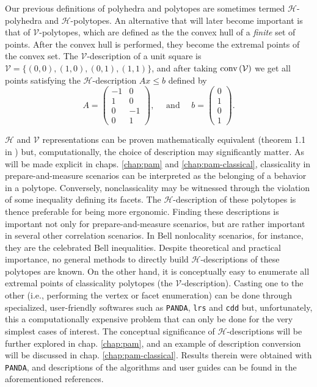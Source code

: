 		Our previous definitions of polyhedra and polytopes are sometimes termed $\mathcal{H}$-polyhedra and $\mathcal{H}$-polytopes. An alternative that will later become important is that of $\mathcal{V}$-polytopes, which are defined as the the convex hull of a \emph{finite} set of points. After the convex hull is performed, they become the extremal points of the convex set. The $\mathcal{V}$-description of a unit square is $\mathcal{V} = \{ (0, 0), (1, 0), (0, 1), (1, 1) \}$, and after taking $\text{conv} \left( \mathcal{V} \right)$ we get all points satisfying the $\mathcal{H}$-description $Ax \leq b$ defined by 
		$$
			A =
			\begin{pmatrix}
				-1 & 0 \\
				1 & 0 \\
				0 & -1 \\
				0 & 1
			\end{pmatrix},
			\quad\text{ and }\quad
			b =
			\begin{pmatrix}
				0 \\
				1 \\
				0 \\
				1
			\end{pmatrix} .
		$$

		$\mathcal{H}$ and $\mathcal{V}$ representations can be proven mathematically equivalent (theorem 1.1 in \cite{ziegler_lecturespolytopes_1995}) but, computationally, the choice of description may significantly matter. As will be made explicit in chaps. \ref{chap:pam} and \ref{chap:pam-classical}, classicality in prepare-and-measure scenarios can be interpreted as the belonging of a behavior in a polytope. Conversely, nonclassicality may be witnessed through the violation of some inequality defining its facets. The $\mathcal{H}$-description of these polytopes is thence preferable for being more ergonomic. Finding these descriptions is important not only for prepare-and-measure scenarios, but are rather important in several other correlation scenarios. In Bell nonlocality scenarios, for instance, they are the celebrated Bell inequalities. Despite theoretical and practical importance, no general methods to directly build $\mathcal{H}$-descriptions of these polytopes are known. On the other hand, it is conceptually easy to enumerate all extremal points of classicality polytopes (the $\mathcal{V}$-description). Casting one to the other (i.e., performing the vertex or facet enumeration) can be done through specialized, user-friendly softwares such as \texttt{PANDA}, \texttt{lrs} and \texttt{cdd} \cite{PANDA,lrs,cdd} but, unfortunately, this a computationally expensive problem that can only be done for the very simplest cases of interest. The conceptual significance of $\mathcal{H}$-descriptions will be further explored in chap. \ref{chap:pam}, and an example of description conversion will be discussed in chap. \ref{chap:pam-classical}. Results therein were obtained with \texttt{PANDA}, and descriptions of the algorithms and user guides can be found in the aforementioned references.

